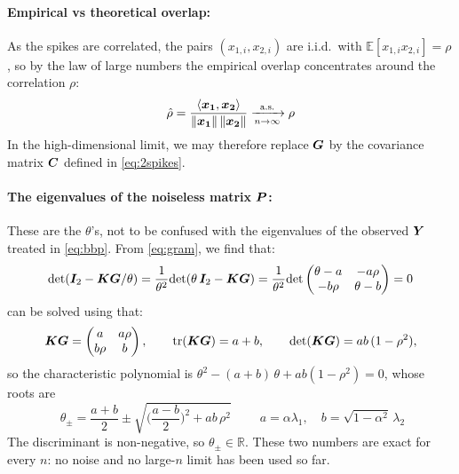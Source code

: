 \documentclass[11pt]{article}
\begin{document}
\paragraph{Empirical vs theoretical overlap:}
As the spikes are correlated, the pairs $(x_{1,i},x_{2,i})$ are i.i.d.\ with $\mathbb{E}[x_{1,i}x_{2,i}] = \rho$, so by the law of large numbers the empirical overlap concentrates around the correlation $\rho$:
\begin{equation}
    \hat\rho = \frac{\langle \bm{x_1},\bm{x_2}\rangle}{\|\bm{x_1}\|\,\|\bm{x_2}\|} \xrightarrow[n\to\infty]{\text{a.s.}} \rho
    \label{eq:overlap}
\end{equation}
In the high-dimensional limit, we may therefore replace $\bm{G}$ by the covariance matrix $\bm{C}$ defined in \eqref{eq:2spikes}.

\paragraph{The eigenvalues of the noiseless matrix $\bm{P}$:}
These are the $\theta$'s, not to be confused with the eigenvalues of the observed $\bm{Y}$ treated in \eqref{eq:bbp}. From \eqref{eq:gram}, we find that:
\begin{equation}
    \mathrm{det}(\bm{I}_2 - \bm{K}\bm{G}/\theta)
    = \frac{1}{\theta^2}\mathrm{det}(\theta\,\bm{I}_2 - \bm{K}\bm{G})
    = \frac{1}{\theta^2}\mathrm{det}\begin{pmatrix} \theta - a & -a\rho \\ -b\rho & \theta - b \end{pmatrix}
    = 0
\end{equation}
can be solved using that:
\begin{equation}
    \bm{K} \bm{G} = \begin{pmatrix} a & a\rho \\ b\rho & b \end{pmatrix},
    \qquad
    \operatorname{tr}(\bm{K}\bm{G}) = a + b,
    \qquad
    \mathrm{det}(\bm{K}\bm{G}) = ab\,(1-\rho^2),
\end{equation}
so the characteristic polynomial is $\theta^2 - (a+b)\,\theta + ab(1-\rho^2) = 0$, whose roots are
\begin{equation}
    \boxed{\;
    \theta_\pm = \frac{a+b}{2} \pm \sqrt{\Big(\frac{a-b}{2}\Big)^2 + ab\,\rho^2}
    \;}
    \qquad
    a = \alpha\lambda_1, \quad b = \sqrt{1-\alpha^2}\,\lambda_2
    \label{eq:theta-pm}
\end{equation}
The discriminant is non-negative, so $\theta_\pm \in \mathbb{R}$. These two numbers are exact for every $n$: no noise and no large-$n$ limit has been used so far.\\
\end{document}
